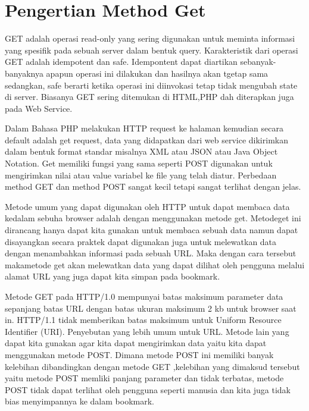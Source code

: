 \section{Pengertian Method Get}
GET adalah operasi read-only yang sering digunakan untuk meminta informasi yang spesifik pada sebuah server dalam bentuk query. 
Karakteristik dari operasi GET adalah idempotent dan safe. Idempontent dapat diartikan sebanyak-banyaknya apapun operasi ini dilakukan 
dan 
hasilnya akan tgetap sama sedangkan, safe berarti ketika operasi ini diinvokasi tetap tidak mengubah state di server.
Biasanya GET sering ditemukan di HTML,PHP dah diterapkan juga pada Web Service.

Dalam Bahasa PHP melakukan HTTP request ke halaman kemudian secara default adalah get request, data yang didapatkan dari web service 
dikirimkan dalam bentuk format standar misalnya XML atau JSON atau Java Object Notation. Get memiliki fungsi yang sama seperti POST 
digunakan untuk mengirimkan nilai atau value variabel ke file yang telah diatur. Perbedaan method GET dan method POST sangat kecil 
tetapi 
sangat terlihat dengan jelas.

Metode umum yang dapat digunakan oleh HTTP untuk dapat membaca data kedalam sebuha browser adalah dengan menggunakan metode get. 
Metodeget ini dirancang hanya dapat kita gunakan untuk membaca sebuah data namun dapat disayangkan secara praktek dapat digunakan juga untuk melewatkan data dengan menambahkan informasi pada sebuah URL. Maka dengan cara tersebut makametode get akan melewatkan data yang dapat dilihat oleh pengguna melalui alamat URL yang juga dapat kita simpan pada bookmark.

Metode GET pada HTTP/1.0 mempunyai batas maksimum parameter data sepanjang batas URL dengan batas ukuran maksimum 2 kb untuk browser 
saat in. HTTP/1.1 tidak memberikan batas maksimum untuk Uniform Resource Identifier (URI). Penyebutan yang lebih umum untuk URL. Metode 
lain yang dapat kita gunakan agar kita dapat  mengirimkan data yaitu kita dapat menggunakan  metode POST. Dimana metode  POST ini 
memiliki banyak kelebihan dibandingkan dengan  metode GET ,kelebihan yang dimaksud tersebut yaitu metode POST  memliki panjang parameter 
dan tidak  terbatas,  metode POST tidak dapat terlihat oleh pengguna  seperti manusia dan  kita juga tidak bias menyimpannya ke dalam 
bookmark.

